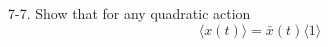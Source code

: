 \documentclass[12pt]{article}
\begin{document}
7-7.
Show that for any quadratic action
\begin{equation*}
\langle x(t)\rangle=\bar x(t)\langle1\rangle
\end{equation*}
\end{document}
